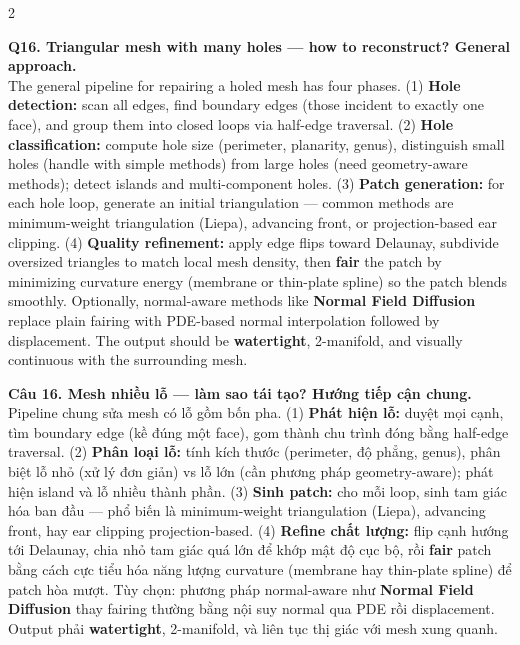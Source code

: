 \begin{paracol}{2}
\switchcolumn*

\textbf{Q16. Triangular mesh with many holes — how to reconstruct? General approach.}\\
The general pipeline for repairing a holed mesh has four phases. (1) \textbf{Hole detection:} scan all edges, find boundary edges (those incident to exactly one face), and group them into closed loops via half-edge traversal. (2) \textbf{Hole classification:} compute hole size (perimeter, planarity, genus), distinguish small holes (handle with simple methods) from large holes (need geometry-aware methods); detect islands and multi-component holes. (3) \textbf{Patch generation:} for each hole loop, generate an initial triangulation — common methods are minimum-weight triangulation (Liepa), advancing front, or projection-based ear clipping. (4) \textbf{Quality refinement:} apply edge flips toward Delaunay, subdivide oversized triangles to match local mesh density, then \textbf{fair} the patch by minimizing curvature energy (membrane or thin-plate spline) so the patch blends smoothly. Optionally, normal-aware methods like \textbf{Normal Field Diffusion} replace plain fairing with PDE-based normal interpolation followed by displacement. The output should be \textbf{watertight}, 2-manifold, and visually continuous with the surrounding mesh.

\switchcolumn

\textbf{Câu 16. Mesh nhiều lỗ — làm sao tái tạo? Hướng tiếp cận chung.}\\
Pipeline chung sửa mesh có lỗ gồm bốn pha. (1) \textbf{Phát hiện lỗ:} duyệt mọi cạnh, tìm boundary edge (kề đúng một face), gom thành chu trình đóng bằng half-edge traversal. (2) \textbf{Phân loại lỗ:} tính kích thước (perimeter, độ phẳng, genus), phân biệt lỗ nhỏ (xử lý đơn giản) vs lỗ lớn (cần phương pháp geometry-aware); phát hiện island và lỗ nhiều thành phần. (3) \textbf{Sinh patch:} cho mỗi loop, sinh tam giác hóa ban đầu — phổ biến là minimum-weight triangulation (Liepa), advancing front, hay ear clipping projection-based. (4) \textbf{Refine chất lượng:} flip cạnh hướng tới Delaunay, chia nhỏ tam giác quá lớn để khớp mật độ cục bộ, rồi \textbf{fair} patch bằng cách cực tiểu hóa năng lượng curvature (membrane hay thin-plate spline) để patch hòa mượt. Tùy chọn: phương pháp normal-aware như \textbf{Normal Field Diffusion} thay fairing thường bằng nội suy normal qua PDE rồi displacement. Output phải \textbf{watertight}, 2-manifold, và liên tục thị giác với mesh xung quanh.

\switchcolumn*


\end{paracol}
